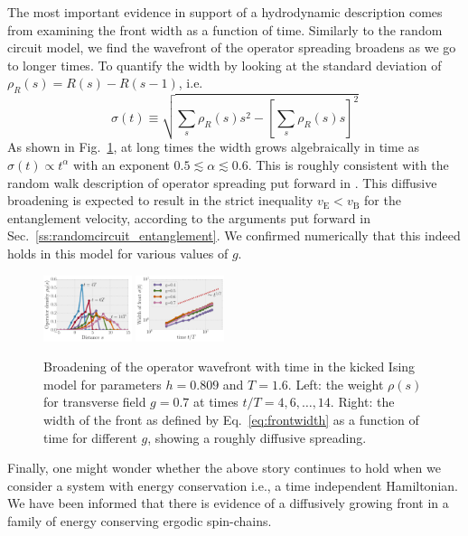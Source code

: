 \documentclass[aps,prb,twocolumn,superscriptaddress]{revtex4-1}
\begin{document}
The most important evidence in support of a hydrodynamic description comes from examining the front width as a function of time. Similarly to the random circuit model, we find the wavefront of the operator spreading broadens as we go to longer times. To quantify the width by looking at the standard deviation of $\rho_R(s) = R(s) - R(s-1)$, i.e.
\begin{equation}\label{eq:frontwidth}
\sigma(t) \equiv \sqrt{\sum_s \rho_R(s) s^2 - \left[\sum_s \rho_R(s) s\right]^2}
\end{equation}
As shown in Fig.~\ref{fig:KimHuse_front_widening}, at long times the width grows algebraically in time as $\sigma(t) \propto t^\alpha$ with an exponent $0.5\lesssim\alpha\lesssim 0.6$. This is roughly consistent with the random walk description of operator spreading put forward in . This diffusive broadening is expected to result in the strict inequality $v_\text{E} < v_\text{B}$ for the entanglement velocity, according to the arguments put forward in Sec.~\ref{ss:randomcircuit_entanglement}. We confirmed numerically that this indeed holds in this model for various values of $g$.

 \begin{figure}[h!]
 \centering
  	\includegraphics[width=0.23\textwidth]{KimHuse_weight_widths_g=0,6.pdf}
  	\includegraphics[width=0.23\textwidth]{KimHuse_weight_timedep.pdf} 
\caption{Broadening of the operator wavefront with time in the kicked Ising model for parameters $h=0.809$ and $T = 1.6$. Left: the weight $\rho(s)$ for transverse field $g=0.7$ at times $t/T = 4, 6, \ldots, 14$. Right: the width of the front as defined by Eq.~\eqref{eq:frontwidth} as a function of time for different $g$, showing a roughly diffusive spreading.}
 \label{fig:KimHuse_front_widening}
 \end{figure}

Finally, one might wonder whether the above story continues to hold when we consider a system with energy conservation i.e., a time independent Hamiltonian. We have been informed\cite{Cheryne} that there is evidence of a diffusively growing front in a family of energy conserving ergodic spin-chains. 
\end{document}
